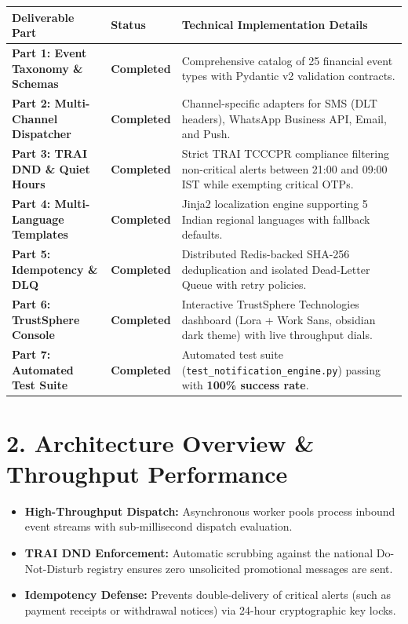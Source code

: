\documentclass[11pt,a4paper]{article}
\begin{document}
\begin{table}[h]
\centering
\scriptsize
\begin{tabular}{@{}llp{8.5cm}@{}}
\toprule
\textbf{Deliverable Part} & \textbf{Status} & \textbf{Technical Implementation Details} \\ \midrule
\textbf{Part 1: Event Taxonomy \& Schemas} & \textbf{Completed} & Comprehensive catalog of 25 financial event types with Pydantic v2 validation contracts. \\
\textbf{Part 2: Multi-Channel Dispatcher} & \textbf{Completed} & Channel-specific adapters for SMS (DLT headers), WhatsApp Business API, Email, and Push. \\
\textbf{Part 3: TRAI DND \& Quiet Hours} & \textbf{Completed} & Strict TRAI TCCCPR compliance filtering non-critical alerts between 21:00 and 09:00 IST while exempting critical OTPs. \\
\textbf{Part 4: Multi-Language Templates} & \textbf{Completed} & Jinja2 localization engine supporting 5 Indian regional languages with fallback defaults. \\
\textbf{Part 5: Idempotency \& DLQ} & \textbf{Completed} & Distributed Redis-backed SHA-256 deduplication and isolated Dead-Letter Queue with retry policies. \\
\textbf{Part 6: TrustSphere Console} & \textbf{Completed} & Interactive TrustSphere Technologies dashboard (Lora + Work Sans, obsidian dark theme) with live throughput dials. \\
\textbf{Part 7: Automated Test Suite} & \textbf{Completed} & Automated test suite (\texttt{test\_notification\_engine.py}) passing with \textbf{100\% success rate}. \\ \bottomrule
\end{tabular}
\end{table}

\section{2. Architecture Overview \& Throughput Performance}
\begin{itemize}[leftmargin=1.5em, itemsep=2pt]
    \item \textbf{High-Throughput Dispatch:} Asynchronous worker pools process inbound event streams with sub-millisecond dispatch evaluation.
    \item \textbf{TRAI DND Enforcement:} Automatic scrubbing against the national Do-Not-Disturb registry ensures zero unsolicited promotional messages are sent.
    \item \textbf{Idempotency Defense:} Prevents double-delivery of critical alerts (such as payment receipts or withdrawal notices) via 24-hour cryptographic key locks.
\end{itemize}
\end{document}
